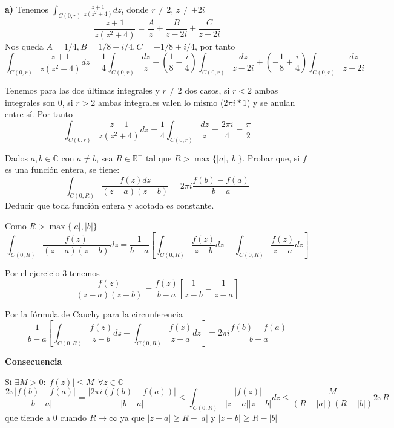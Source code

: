 \begin{sol}

\textbf{a)}
Tenemos $\int_{C(0,r)} \frac{z+1}{z(z^2+4)} dz$, donde $r\not = 2$, $z\not = \pm 2i$
$$\frac{z+1}{z(z^2+4)} = \frac{A}{z} + \frac{B}{z-2i} + \frac{C}{z+2i}$$
Nos queda $A = 1/4, B=1/8-i/4, C = -1/8+i/4$, por tanto
$$\int_{C(0,r)} \frac{z+1}{z(z^2+4)} dz = \frac{1}{4} \int_{C(0,r)} \frac{dz}{z} 
+ \left(\frac{1}{8}-\frac{i}{4}\right)\int_{C(0,r)} \frac{dz}{z-2i} 
+
\left(-\frac{1}{8}+\frac{i}{4}\right) \int_{C(0,r)} \frac{dz}{z+2i}$$

Tenemos para las dos últimas integrales y $r\not = 2$ dos casos, si $r<2$ ambas integrales son $0$, si $r>2$ ambas integrales valen lo mismo ($2\pi i *1$) y se anulan entre sí. Por tanto
$$\int_{C(0,r)} \frac{z+1}{z(z^2+4)} dz
=
\frac{1}{4}\int_{C(0,r)} \frac{dz}{z} = \frac{2\pi i}{4} = \frac{\pi}{2}$$

\end{sol}


\begin{ejer}
	Dados $a,b\in\mathbb{C}$ con $a\not =b$, sea $R\in\mathbb{R}^+$ tal que $R>\max \{|a|,|b|\}$. Probar que, si $f$ es una función entera, se tiene:
	$$ \int_{C(0,R)} \frac{f(z)dz}{(z-a)(z-b)} = 2\pi i\frac{f(b)-f(a)}{b-a} $$
	Deducir que toda función entera y acotada es constante.
\end{ejer}
\begin{sol}

Como $R>\max\{ |a|, |b| \}$
$$\int_{C(0,R)} \frac{f(z)}{(z-a)(z-b)}dz = \frac{1}{b-a} \left[ \int_{C(0,R)} \frac{f(z)}{z-b}dz - \int_{C(0,R)} \frac{f(z)}{z-a}dz \right]$$

Por el ejercicio $3$ tenemos
$$\frac{f(z)}{(z-a)(z-b)} = \frac{f(z)}{b-a} \left[ \frac{1}{z-b} - \frac{1}{z-a} \right]$$

Por la fórmula de Cauchy para la circunferencia
$$\frac{1}{b-a} \left[ \int_{C(0,R)} \frac{f(z)}{z-b}dz - \int_{C(0,R)} \frac{f(z)}{z-a}dz \right] = 2\pi i\frac{f(b) - f(a)}{b-a}$$

\textbf{Consecuencia}

Si $\exists M>0 : |f(z)|\leq M\ \ \forall z \in \mathbb{C}$
$$\frac{2\pi |f(b)-f(a)|}{|b-a|} = \frac{|2\pi i(f(b)-f(a))|}{|b-a|} 
\leq \int_{C(0,R)} \frac{|f(z)|}{|z-a||z-b|} dz \leq \frac{M}{(R-|a|)(R-|b|)} 2\pi R$$
que tiende a $0$ cuando $R\rightarrow \infty$ ya que $|z-a|\geq R-|a|$ y $|z-b|\geq R - |b|$
\end{sol}